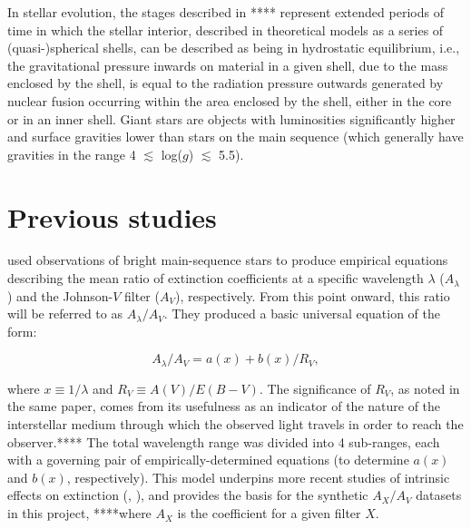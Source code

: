 \documentclass[12pt, a4paper]{report}
\begin{document}
In stellar evolution, the stages described in **** represent extended periods of time in which the stellar interior, described in theoretical models as a series of (quasi-)spherical shells, can be described as being in hydrostatic equilibrium, i.e., the gravitational pressure inwards on material in a given shell, due to the mass enclosed by the shell, is equal to the radiation pressure outwards generated by nuclear fusion occurring within the area enclosed by the shell, either in the core or in an inner shell. Giant stars are objects with luminosities significantly higher and surface gravities lower than stars on the main sequence (which generally have gravities in the range 4 $\lesssim$ log($g$) $\lesssim$ 5.5).

\section{Previous studies}
\cite{1989ApJ...345..245C} used observations of bright main-sequence stars to produce empirical equations describing the mean ratio of extinction coefficients at a specific wavelength $\lambda$ ($A_{\lambda}$) and the Johnson-$V$ filter ($A_{V}$), respectively. From this point onward, this ratio will be referred to as $A_{\lambda}/A_{V}$. They produced a basic universal equation of the form:


\begin{equation}
A_{\lambda}/A_{V} = a(x) + b(x)/R_{V},
\label{CCM_general}
\end{equation}

where $x \equiv 1/\lambda$ and $R_{V} \equiv A(V)/E(B-V)$. The significance of $R_{V}$, as noted in the same paper, comes from its usefulness as an indicator of the nature of the interstellar medium through which the observed light travels in order to reach the observer.**** The total wavelength range was divided into 4 sub-ranges, each with a governing pair of empirically-determined equations (to determine $a(x)$ and $b(x)$, respectively). This model underpins more recent studies of intrinsic effects on extinction (\cite{2008PASP..120..583G}, \cite{2018MNRAS.479L.102C}), and provides the basis for the synthetic $A_{X}/A_{V}$ datasets in this project, ****where $A_{X}$ is the coefficient for a given filter $X$.
\end{document}
